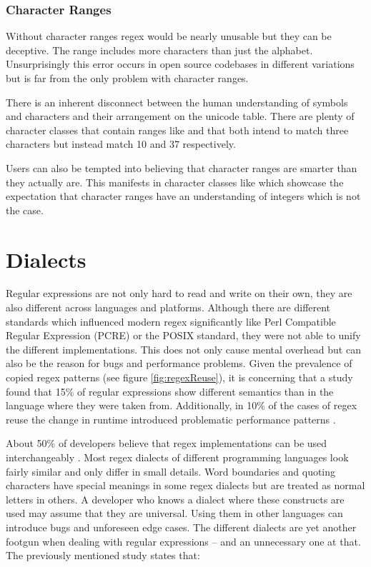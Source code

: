 \subsubsection{Character Ranges}

Without character ranges regex would be nearly unusable but they can be deceptive. The range \pattern{[A-z]} includes more characters than just the alphabet. Unsurprisingly this error occurs in open source codebases in different variations \cite{RegexErrorCamelLetterRange}\cite{RegexErrorApacheGeodeLetterRange}\cite{RegexErrorElasticSearchLetterRange} but is far from the only problem with character ranges.

There is an inherent disconnect between the human understanding of symbols and characters and their arrangement on the unicode table. There are plenty of character classes that contain ranges like \pattern{[\%-.]} \cite{RegexErrorJenkinsSpecialRange} and \pattern{[;-\_]} \cite{RegexErrorQuizconnectSpecialRange} that both intend to match three characters but instead match 10 and 37 respectively.

Users can also be tempted into believing that character ranges are smarter than they actually are. This manifests in character classes like \pattern{[0-31]} \cite{RegexErrorHadoopNumberRange} which showcase the expectation that character ranges have an understanding of integers which is not the case.

\section{Dialects}

Regular expressions are not only hard to read and write on their own, they are also different across languages and platforms. Although there are different standards which influenced modern regex significantly like Perl Compatible Regular Expression (PCRE) or the POSIX standard, they were not able to unify the different implementations. This does not only cause mental overhead but can also be the reason for bugs and performance problems. Given the prevalence of copied regex patterns (see figure \ref{fig:regexReuse}), it is concerning that a study found that 15\% of regular expressions show different semantics than in the language where they were taken from. Additionally, in 10\% of the cases of regex reuse the change in runtime introduced problematic performance patterns \cite{RegexNotLinguaFranca}.

About 50\% of developers believe that regex implementations can be used interchangeably \cite{RegexNotLinguaFranca}. Most regex dialects of different programming languages look fairly similar and only differ in small details. Word boundaries  and quoting characters  have special meanings in some regex dialects but are treated as normal letters in others. A developer who knows a dialect where these constructs are used may assume that they are universal. Using them in other languages can introduce bugs and unforeseen edge cases. The different dialects are yet another footgun when dealing with regular expressions -- and an unnecessary one at that. The previously mentioned study \cite{RegexNotLinguaFranca} states that:

